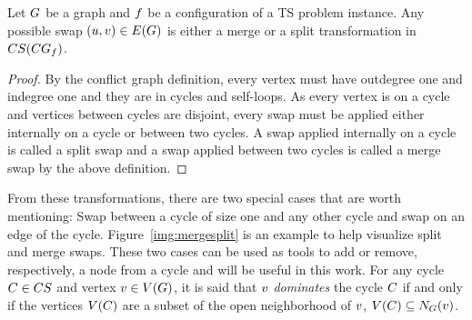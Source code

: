 \documentclass[msc,english,table,xcdraw]{ppgccufmg}
\begin{document}
\begin{lemma}
\label{lem:allswaps}
Let $G$ be a graph and $f$ be a configuration of a TS problem 
instance.
Any possible swap $(u, v) \in E(G)$ is either a 
merge or a split transformation in $CS(CG_
{f})$.
\end{lemma}

\begin{proof}
By the conflict graph definition, every vertex must have outdegree one and indegree 
one and they are in cycles and self-loops.
As every vertex is on a cycle and vertices between cycles are disjoint, every swap 
must be applied either internally on a cycle or between two cycles.
A swap applied internally on a cycle is called a split swap and a swap applied
between two cycles is called a merge swap by the above definition.
\end{proof}


From these transformations, there are two special cases that are worth 
mentioning: Swap between a cycle of size one and any other cycle and swap on an 
edge of the cycle.
Figure~\ref{img:mergesplit} is an example to help visualize split and merge swaps.
These two cases can be used as tools to add or remove, respectively, a node from 
a cycle and will be useful in this work.
For any cycle $C \in CS$ and vertex $v \in V(G)$,
it is said that $v$ \textit{dominates} the cycle $C$ if and only if
the vertices $V(C)$ are a subset of the open neighborhood of 
$v$, $V(C) \subseteq N_{G}(v)$.


\end{document}
